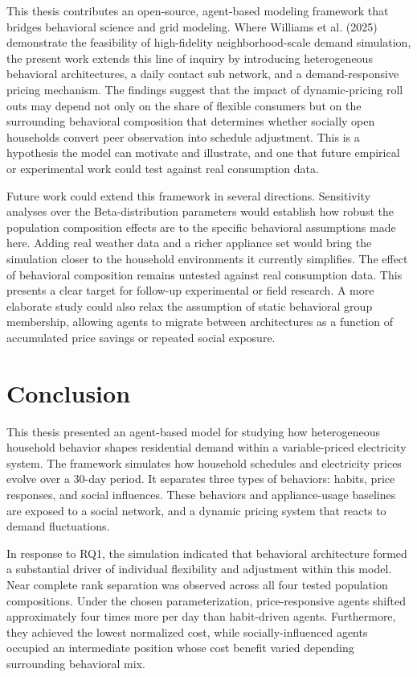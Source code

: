 \documentclass[11pt, a4paper]{article}
\begin{document}
This thesis contributes an open-source, agent-based modeling framework that bridges behavioral science and grid modeling. Where Williams et al. (2025) demonstrate the feasibility of high-fidelity neighborhood-scale demand simulation, the present work extends this line of inquiry by introducing heterogeneous behavioral architectures, a daily contact sub network, and a demand-responsive pricing mechanism. The findings suggest that the impact of dynamic-pricing roll outs may depend not only on the share of flexible consumers but on the surrounding behavioral composition that determines whether socially open households convert peer observation into schedule adjustment. This is a hypothesis the model can motivate and illustrate, and one that future empirical or experimental work could test against real consumption data.
 
Future work could extend this framework in several directions. Sensitivity analyses over the Beta-distribution parameters would establish how robust the population composition effects are to the specific behavioral assumptions made here. Adding real weather data and a richer appliance set would bring the simulation closer to the household environments it currently simplifies. The effect of behavioral composition remains untested against real consumption data. This presents a clear target for follow-up experimental or field research. A more elaborate study could also relax the assumption of static behavioral group membership, allowing agents to migrate between architectures as a function of accumulated price savings or repeated social exposure.

\section{Conclusion}

This thesis presented an agent-based model for studying how heterogeneous household behavior shapes residential demand within a variable-priced electricity system. The framework simulates how household schedules and electricity prices evolve over a 30-day period. It separates three types of behaviors: habits, price responses, and social influences. These behaviors and appliance-usage baselines are exposed to a social network, and a dynamic pricing system that reacts to demand fluctuations.
 
In response to RQ1, the simulation indicated that behavioral architecture formed a substantial driver of individual flexibility and adjustment within this model. Near complete rank separation was observed across all four tested population compositions. Under the chosen parameterization, price-responsive agents shifted approximately four times more per day than habit-driven agents. Furthermore, they achieved the lowest normalized cost, while socially-influenced agents occupied an intermediate position whose cost benefit varied depending surrounding behavioral mix.
 
\end{document}
